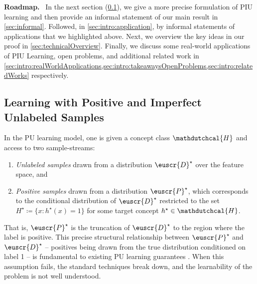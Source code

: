 \documentclass[11pt]{article}
\theoremstyle{plain}
\theoremstyle{definition}
\theoremstyle{remark}
\newcommand{\customcal}[1]{\euscr{#1}}
\newcommand{\cD}{\customcal{D}}
\newcommand{\cP}{\customcal{P}}
\renewcommand{\paragraph}[1]{\medskip \noindent\textbf{#1}~}
\newcommand{\hypo}[1]{\mathdutchcal{#1}}
\newcommand{\hyH}{\hypo{H}}
\newcommand{\optset}{{H^\star}}
\newcommand{\cDtrue}{\cD^\star}
\newcommand{\cPtrue}{\cP^\star}
\begin{document}
    \paragraph{Roadmap.} 
        In the next section (\cref{sec:intro:PIU}), we give a more precise formulation of PIU learning and then provide an informal statement of our main result in \cref{sec:informal}.
        Followed, in \cref{sec:intro:application}, by informal statements of applications that we highlighted above.
        Next, we overview the key ideas in our proof in \cref{sec:technicalOverview}. 
        Finally, we discuss some real-world applications of PIU Learning, open problems, and additional related work in \cref{sec:intro:realWorldApplications,sec:intro:takeawaysOpenProblems,sec:intro:relatedWorks} respectively. 
        
     
   
\subsection{Learning with Positive and Imperfect Unlabeled Samples} \label{sec:intro:PIU}

In the PU learning model, one is given a concept class $\hyH$ and access to two sample-streams:
\begin{enumerate}[leftmargin=19pt,itemsep=0pt]
  \item[(a)] \textit{Unlabeled samples} drawn from a distribution $\cDtrue$ over the feature space, and 
  \item[(b)] \textit{Positive samples} drawn from a distribution $\cPtrue$, which corresponds to the conditional distribution of $\cDtrue$ restricted to the set $\optset \coloneqq \{x : h^{\star}(x) = 1\}$ for some target concept $h^{\star} \in \hyH$. 
\end{enumerate}  
That is, $\cPtrue$ is the truncation of $\cDtrue$ to the region where the label is positive. This precise structural relationship between $\cPtrue$ and $\cDtrue$ -- positives being drawn from the true distribution conditioned on label 1 -- is fundamental to existing PU learning guarantees \cite{denis1990positive}. When this assumption fails, the standard techniques break down, and the learnability of the problem is not well understood.
\end{document}
